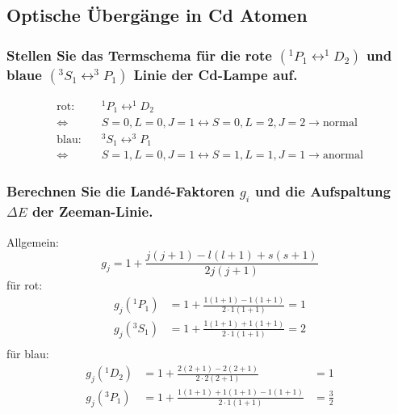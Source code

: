 \subsection{Optische Übergänge in Cd Atomen}

\subsubsection[]{Stellen Sie das Termschema für die rote $(^1P_1 \leftrightarrow ^1D_2)$ und blaue 
$(^3S_1 \leftrightarrow ^3P_1)$ Linie der Cd-Lampe auf.}
\begin{align*}
    \text{rot: } \quad&^1P_1 \leftrightarrow ^1D_2 \\\iff &S=0, L=0, J=1\leftrightarrow S=0, L=2, J=2 \to\text{normal}\\
    \text{blau:} \quad&^3S_1 \leftrightarrow ^3P_1 \\\iff &S=1, L=0, J=1\leftrightarrow S=1, L=1, J=1 \to\text{anormal}   
\end{align*}

\subsubsection[]{Berechnen Sie die Landé-Faktoren $g_i$ und die Aufspaltung $\Delta E$ der Zeeman-Linie.}
Allgemein:
\begin{equation*}
    g_j=1+\frac{j(j+1)-l(l+1)+s(s+1)}{2j(j+1)}
\end{equation*}
für rot:
\begin{align*}
    g_j(^1P_1)&=1+\frac{1(1+1)-1(1+1)}{2\cdot 1(1+1)}=1\\
    g_j(^3S_1)&=1+\frac{1(1+1)+1(1+1)}{2\cdot 1(1+1)}=2\\
\end{align*}
für blau:
\begin{align*}
    g_j(^1D_2)&=1+\frac{2(2+1)-2(2+1)}{2\cdot 2(2+1)}        &=1\\
    g_j(^3P_1)&=1+\frac{1(1+1)+1(1+1)-1(1+1)}{2\cdot 1(1+1)} &=\frac{3}{2}
\end{align*}

